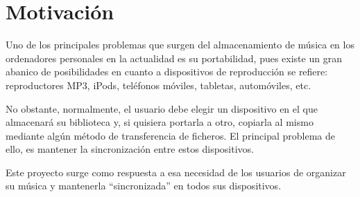\section{Motivación}

Uno de los principales problemas que surgen del almacenamiento de música en los ordenadores personales en la actualidad es su portabilidad, pues existe un gran abanico de posibilidades en cuanto a dispositivos de reproducción se refiere: reproductores MP3, iPods, teléfonos móviles, tabletas, automóviles, etc. 

No obstante, normalmente, el usuario debe elegir un dispositivo en el que almacenará su biblioteca y, si quisiera portarla a otro, copiarla al mismo mediante algún método de transferencia de ficheros. El principal problema de ello, es mantener la sincronización entre estos dispositivos.

Este proyecto surge como respuesta a esa necesidad de los usuarios de organizar su música y mantenerla ``sincronizada'' en todos sus dispositivos.

